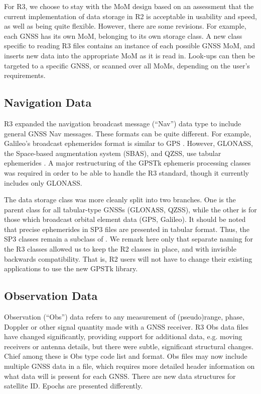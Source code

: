 For R3, we choose to stay with the MoM design based on an assessment that  
the current implementation of data storage in R2 is
acceptable in usability and speed, as well as being quite flexible. However, there are 
some revisions.  For
example, each GNSS has its own MoM, belonging to its own storage
class.  A new class specific to reading R3 files contains an instance
of each possible GNSS MoM, and inserts new data into the appropriate
MoM as it is read in.  Look-ups can then be targeted to a specific
GNSS, or scanned over all MoMs, depending on the user's requirements.


\subsection*{Navigation Data}

R3 expanded the navigation broadcast message (``Nav'') data type to
include general GNSS Nav messages.  These formats can be quite
different. For example, Galileo's broadcast ephemerides format is
similar to GPS \cite{Hofmann2008}. However, GLONASS, the Space-based augmentation
system (SBAS), and QZSS, use tabular ephemerides \cite{glonassicd50}.  A major
restructuring of the GPSTk ephemeris processing classes was required in order to
be able to handle the R3 standard, though it currently includes only
GLONASS.

The data storage class was more cleanly split into two
branches.  One is the parent class for all tabular-type GNSSs
(GLONASS, QZSS), while the other is for those which broadcast orbital
element data (GPS, Galileo).  It should be noted that precise
ephemerides in SP3 files are presented in tabular format.  Thus, the
SP3 classes remain a subclass of .  We remark here only that separate
naming for the R3 classes allowed us to keep the R2 classes in place,
and with invisible backwards compatibility.  That is, R2 users will
not have to change their existing applications to use the new GPSTk
library.


\subsection*{Observation Data}

Observation (``Obs'') data refers to any measurement of (pseudo)range,
phase, Doppler or other signal quantity made with a GNSS receiver.  R3
Obs data files have changed significantly, providing support for
additional data, e.g. moving receivers or antenna details, but there
were subtle, significant structural changes.  Chief among these is Obs
type code list and format.  Obs files may now include multiple GNSS
data in a file, which requires more detailed header information on
what data will is present for each GNSS.  There are new data
structures for satellite ID.  Epochs are presented differently.

